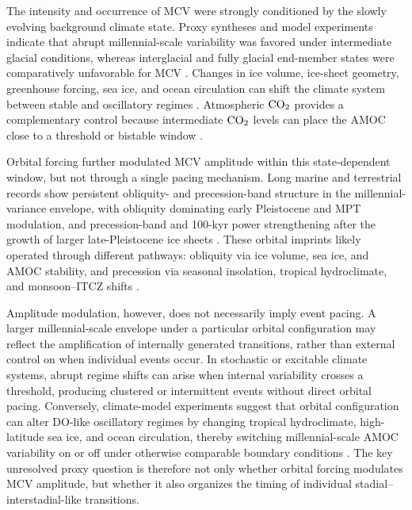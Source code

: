 \documentclass[11pt]{article}
\begin{document}
The intensity and occurrence of MCV were strongly conditioned by the slowly evolving background climate state. Proxy syntheses and model experiments indicate that abrupt millennial-scale variability was favored under intermediate glacial conditions, whereas interglacial and fully glacial end-member states were comparatively unfavorable for MCV \citep{dansgaard1993evidence, barker2011800, kawamura2007northern, malmierca2023dansgaard}. Changes in ice volume, ice-sheet geometry, greenhouse forcing, sea ice, and ocean circulation can shift the climate system between stable and oscillatory regimes \citep{zhang2017abrupt, vettoretti2022atmospheric, zhang2021direct, malmierca2023dansgaard}. Atmospheric \(\ce{CO2}\) \citep{bereiter2015revision} provides a complementary control because intermediate \(\ce{CO2}\) levels can place the AMOC close to a threshold or bistable window \citep{zhang2017abrupt, vettoretti2022atmospheric}. 


Orbital forcing further modulated MCV amplitude within this state-dependent window, but not through a single pacing mechanism. Long marine and terrestrial records show persistent obliquity- and precession-band structure in the millennial-variance envelope, with obliquity dominating early Pleistocene and MPT modulation, and precession-band and 100-kyr power strengthening after the growth of larger late-Pleistocene ice sheets \citep{sun2021persistent, hodell20231, thirumalai2020methane}. These orbital imprints likely operated through different pathways: obliquity via ice volume, sea ice, and AMOC stability, and precession via seasonal insolation, tropical hydroclimate, and monsoon--ITCZ shifts \citep{sun2021persistent, zhang2021direct}. 

Amplitude modulation, however, does not necessarily imply event pacing. A larger millennial-scale envelope under a particular orbital configuration may reflect the amplification of internally generated transitions, rather than external control on when individual events occur. In stochastic or excitable climate systems, abrupt regime shifts can arise when internal variability crosses a threshold, producing clustered or intermittent events without direct orbital pacing. Conversely, climate-model experiments suggest that orbital configuration can alter DO-like oscillatory regimes by changing tropical hydroclimate, high-latitude sea ice, and ocean circulation, thereby switching millennial-scale AMOC variability on or off under otherwise comparable boundary conditions \citep{zhang2021direct, malmierca2023dansgaard}. The key unresolved proxy question is therefore not only whether orbital forcing modulates MCV amplitude, but whether it also organizes the timing of individual stadial--interstadial-like transitions.
\end{document}
